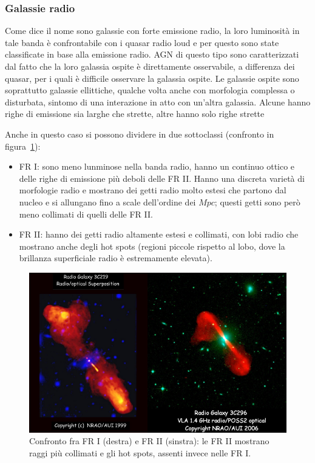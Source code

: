 \subsubsection{Galassie radio}
Come dice il nome sono galassie con forte emissione radio, la loro luminosità in tale banda è confrontabile con i quasar radio loud e per questo sono state classificate in base alla emissione radio. AGN di questo tipo sono caratterizzati dal fatto che la loro galassia ospite è direttamente osservabile, a differenza dei quasar, per i quali è difficile osservare la galassia ospite. Le galassie ospite sono soprattutto galassie ellittiche, qualche volta anche con morfologia complessa o disturbata, sintomo di una interazione in atto con un'altra galassia. Alcune hanno righe di emissione sia larghe che strette, altre hanno solo righe strette 

Anche in questo caso si possono dividere in due sottoclassi (confronto in figura~\ref{fig:galassie-radio}):
\begin{itemize}
    \item FR I: sono meno lunminose nella banda radio, hanno un continuo ottico e delle righe di emissione più deboli delle FR II. Hanno una discreta varietà di morfologie radio e mostrano dei getti radio molto estesi che partono dal nucleo e si allungano fino a scale dell’ordine dei $\si{Mpc}$; questi getti sono però meno collimati di quelli delle FR II.  
    \item FR II: hanno dei getti radio altamente estesi e collimati, con lobi radio che mostrano anche degli hot spots (regioni piccole rispetto al lobo, dove la brillanza superficiale radio è estremamente elevata). 
\end{itemize}

\begin{figure}
    \centering
    \includegraphics[width = 0.8 \textwidth]{immagini/galassie-radio.png}
    \caption{Confronto fra FR I (destra) e FR II (sinstra): le FR II mostrano raggi più collimati e gli hot spots, assenti invece nelle FR I.}
    \label{fig:galassie-radio}
\end{figure}

